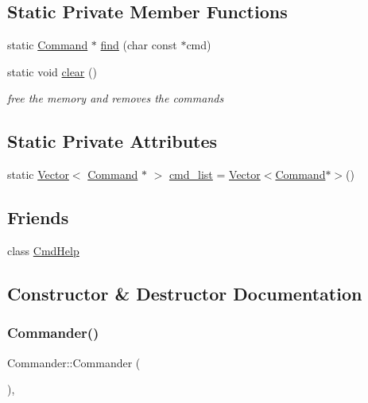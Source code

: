 \subsection*{Static Private Member Functions}
\begin{DoxyCompactItemize}
\item 
static \hyperlink{classCommand}{Command} $\ast$ \hyperlink{classCommander_a544dc076c0f448ebf284585cfcd68fcb}{find} (char const $\ast$cmd)
\item 
static void \hyperlink{classCommander_a4c16aa1bbc5ec2045d3e66f146d54884}{clear} ()
\begin{DoxyCompactList}\small\item\em free the memory and removes the commands \end{DoxyCompactList}\end{DoxyCompactItemize}
\subsection*{Static Private Attributes}
\begin{DoxyCompactItemize}
\item 
static \hyperlink{classVector}{Vector}$<$ \hyperlink{classCommand}{Command} $\ast$ $>$ \hyperlink{classCommander_a9ea9e51d41b21de3a637090eaea7558b}{cmd\+\_\+list} = \hyperlink{classVector}{Vector}$<$\hyperlink{classCommand}{Command}$\ast$$>$()
\end{DoxyCompactItemize}
\subsection*{Friends}
\begin{DoxyCompactItemize}
\item 
class \hyperlink{classCommander_aaf5700242631ebac67a8b2f6eaf9c730}{Cmd\+Help}
\end{DoxyCompactItemize}


\subsection{Constructor \& Destructor Documentation}
\mbox{\label{classCommander_accd2048a7f1b8aa3a2b362493d546495}} 
\subsubsection{\texorpdfstring{Commander()}{Commander()}\hspace{0.1cm}{\footnotesize\ttfamily [1/2]}}
{\footnotesize\ttfamily Commander\+::\+Commander (\begin{DoxyParamCaption}{ }\end{DoxyParamCaption})\hspace{0.3cm}{\ttfamily [private]}, {\ttfamily [delete]}}

